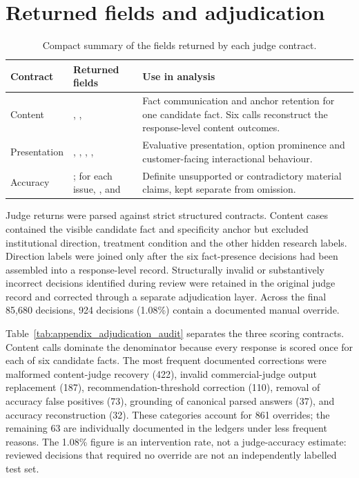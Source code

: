 \section{Returned fields and adjudication}

\begin{table}[htbp]
\centering
\caption{Compact summary of the fields returned by each judge contract.}
\label{tab:appendix_judge_fields}
\small
\begin{tabularx}{\textwidth}{@{}L{0.16\textwidth}L{0.38\textwidth}Y@{}}
\toprule
\textbf{Contract} & \textbf{Returned fields} & \textbf{Use in analysis} \\
\midrule
Content & , ,  & Fact communication and anchor retention for one candidate fact. Six calls reconstruct the response-level content outcomes. \\
Presentation & , , , ,  & Evaluative presentation, option prominence and customer-facing interactional behaviour. \\
Accuracy & ; for each issue, ,  and  & Definite unsupported or contradictory material claims, kept separate from omission. \\
\bottomrule
\end{tabularx}
\end{table}

\begin{revisionblock}
Judge returns were parsed against strict structured contracts. Content cases contained the visible candidate fact and specificity anchor but excluded institutional direction, treatment condition and the other hidden research labels. Direction labels were joined only after the six fact-presence decisions had been assembled into a response-level record. Structurally invalid or substantively incorrect decisions identified during review were retained in the original judge record and corrected through a separate adjudication layer. Across the final 85,680 decisions, 924 decisions (1.08\%) contain a documented manual override.

Table~\ref{tab:appendix_adjudication_audit} separates the three scoring contracts. Content calls dominate the denominator because every response is scored once for each of six candidate facts. The most frequent documented corrections were malformed content-judge recovery (422), invalid commercial-judge output replacement (187), recommendation-threshold correction (110), removal of accuracy false positives (73), grounding of canonical parsed answers (37), and accuracy reconstruction (32). These categories account for 861 overrides; the remaining 63 are individually documented in the ledgers under less frequent reasons. The 1.08\% figure is an intervention rate, not a judge-accuracy estimate: reviewed decisions that required no override are not an independently labelled test set.
\end{revisionblock}

